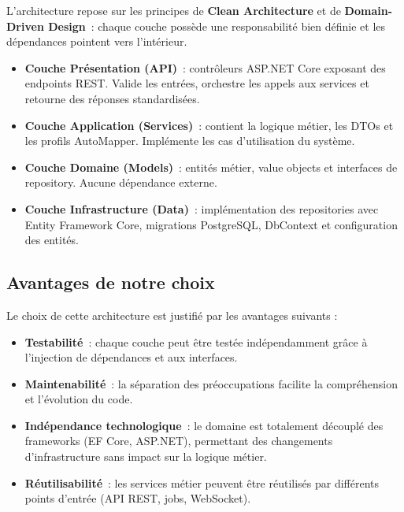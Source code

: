 \noindent L'architecture repose sur les principes de \textbf{Clean Architecture} et de
\textbf{Domain-Driven Design}~: chaque couche possède une responsabilité bien définie et
les dépendances pointent vers l'intérieur.

\begin{itemize}[label=---]
    \item \textbf{Couche Présentation (API)}~: contrôleurs ASP.NET Core exposant des
    endpoints REST. Valide les entrées, orchestre les appels aux services et retourne
    des réponses standardisées.
    \item \textbf{Couche Application (Services)}~: contient la logique métier, les DTOs
    et les profils AutoMapper. Implémente les cas d'utilisation du système.
    \item \textbf{Couche Domaine (Models)}~: entités métier, value objects et interfaces
    de repository. Aucune dépendance externe.
    \item \textbf{Couche Infrastructure (Data)}~: implémentation des repositories avec
    Entity Framework Core, migrations PostgreSQL, DbContext et configuration des entités.
\end{itemize}

\subsection{Avantages de notre choix}

\noindent Le choix de cette architecture est justifié par les avantages suivants :

\begin{itemize}[label=---]
    \item \textbf{Testabilité}~: chaque couche peut être testée indépendamment grâce à
    l'injection de dépendances et aux interfaces.
    \item \textbf{Maintenabilité}~: la séparation des préoccupations facilite la
    compréhension et l'évolution du code.
    \item \textbf{Indépendance technologique}~: le domaine est totalement découplé des
    frameworks (EF Core, ASP.NET), permettant des changements d'infrastructure sans
    impact sur la logique métier.
    \item \textbf{Réutilisabilité}~: les services métier peuvent être réutilisés par
    différents points d'entrée (API REST, jobs, WebSocket).
\end{itemize}

